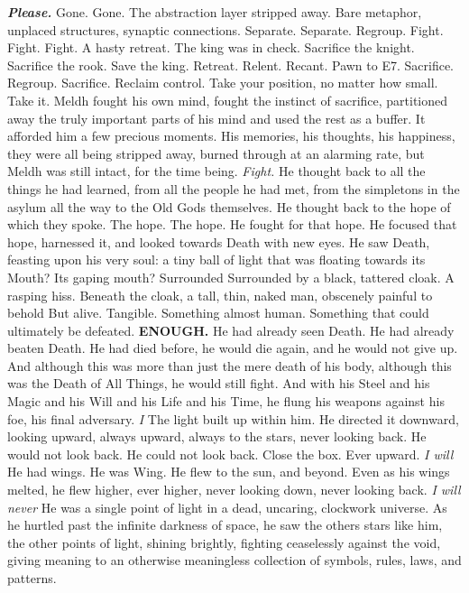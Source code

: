 \emph{\textbf{Please.}}
\SomeVSpace
Gone. Gone. The abstraction layer stripped away. Bare metaphor, unplaced structures, synaptic connections. Separate. Separate. Regroup. Fight. Fight. Fight.
\SmallVSpace
A hasty retreat. The king was in check. Sacrifice the knight. Sacrifice the rook. Save the king. Retreat. Relent. Recant. Pawn to E7. Sacrifice. Regroup. Sacrifice. Reclaim control. Take your position, no matter how small. Take it.
\SmallVSpace
Meldh fought his own mind, fought the instinct of sacrifice, partitioned away the truly important parts of his mind and used the rest as a buffer. It afforded him a few precious moments. His memories, his thoughts, his happiness, they were all being stripped away, burned through at an alarming rate, but Meldh was still intact, for the time being.
\SmallVSpace
\emph{Fight.}
\SmallVSpace
He thought back to all the things he had learned, from all the people he had met, from the simpletons in the asylum all the way to the Old Gods themselves. He thought back to the hope of which they spoke. The hope. The hope. He fought for that hope.
\SmallVSpace
He focused that hope, harnessed it, and looked towards Death with new eyes. He saw Death, feasting upon his very soul: a tiny ball of light that was floating towards its{\el} Mouth?
\SmallVSpace
Its gaping mouth? Surrounded{\el} Surrounded by a black, tattered cloak. A rasping hiss. Beneath the cloak, a tall, thin, naked man, obscenely painful to behold{\el} But alive. Tangible. Something almost human. Something that could ultimately be defeated.
\SomeVSpace
\textbf{ENOUGH.}
\SomeVSpace
He had already seen Death. He had already beaten Death. He had died before, he would die again, and he would not give up. And although this was more than just the mere death of his body, although this was the Death of All Things, he would still fight. And with his Steel and his Magic and his Will and his Life and his Time, he flung his weapons against his foe, his final adversary.
\SmallVSpace
\emph{I{\el}}
\SmallVSpace
The light built up within him. He directed it downward, looking upward, always upward, always to the stars, never looking back. He would not look back. He could not look back. Close the box. Ever upward.
\SmallVSpace
\emph{I will{\el}}
\SmallVSpace
He had wings. He was Wing. He flew to the sun, and beyond. Even as his wings melted, he flew higher, ever higher, never looking down, never looking back.
\SmallVSpace
\emph{I will never{\el}}
\SmallVSpace
He was a single point of light in a dead, uncaring, clockwork universe. As he hurtled past the infinite darkness of space, he saw the others stars like him, the other points of light, shining brightly, fighting ceaselessly against the void, giving meaning to an otherwise meaningless collection of symbols, rules, laws, and patterns.
